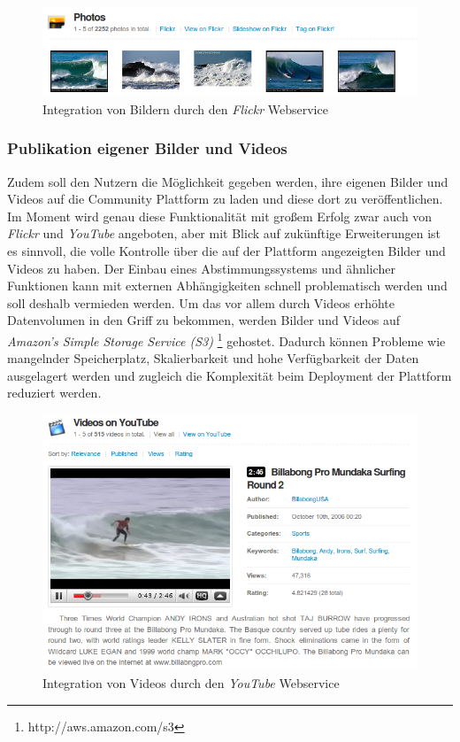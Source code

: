 \begin{figure}[h]
 \includegraphics[width=\textwidth]{bilder/photos-flickr}
 \caption{Integration von Bildern durch den \textit{Flickr}
      Webservice}
 \label{piktogramm}
\end{figure}

\subsubsection{Publikation eigener Bilder und Videos}
Zudem soll den Nutzern die Möglichkeit gegeben werden, ihre eigenen
Bilder und Videos auf die Community Plattform zu laden und diese dort
zu veröffentlichen. Im Moment wird genau diese Funktionalität mit
großem Erfolg zwar auch von \textit{Flickr} und \textit{YouTube}
angeboten, aber mit Blick auf zukünftige Erweiterungen ist es
sinnvoll, die volle Kontrolle über die auf der Plattform angezeigten
Bilder und Videos zu haben. Der Einbau eines Abstimmungssystems und
ähnlicher Funktionen kann mit externen Abhängigkeiten schnell
problematisch werden und soll deshalb vermieden werden. Um das vor
allem durch Videos erhöhte Datenvolumen in den Griff zu bekommen,
werden Bilder und Videos auf \textit{Amazon's Simple Storage Service
  (S3)} \footnote{http://aws.amazon.com/s3} gehostet. Dadurch können
Probleme wie mangelnder Speicherplatz, Skalierbarkeit und hohe
Verfügbarkeit der Daten ausgelagert werden und zugleich die
Komplexität beim Deployment der Plattform reduziert werden.

\begin{figure}[h]
 \includegraphics[width=\textwidth]{bilder/youtube}
 \caption{Integration von Videos durch den \textit{YouTube}
      Webservice}
 \label{youtube}
\end{figure}

